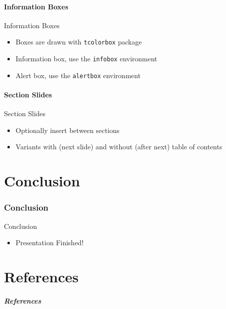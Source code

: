 \documentclass[xcolor={dvipsnames}, aspectratio=169]{beamer}
\begin{document}
\subsection{Information Boxes}
\begin{frame}{Information Boxes}
  \begin{minipage}{0.45\textwidth}
    \centering
    \begin{itemize}
    \item Boxes are drawn with \texttt{tcolorbox} package
    \item<2-> Information box, use the \texttt{infobox} environment
    \item<3-> Alert box, use the \texttt{alertbox} environment
    \end{itemize}
    \end{minipage}
  \begin{minipage}{0.45\textwidth}
    \centering
  \end{minipage}
\end{frame}

\subsection{Section Slides}
\begin{frame}{Section Slides}
  \begin{itemize}
  \item Optionally insert between sections
  \item Variants with (next slide) and without (after next) table of contents
  \end{itemize}
\end{frame}


\part[Conclusion]{Conclusion}
\section{Conclusion}
\begin{frame}{Conclusion}
  \begin{itemize}
    \item Presentation Finished!
  \end{itemize}
\end{frame}

\part[References]{References}
\begin{frame}[allowframebreaks]
  \frametitle{References}
\end{frame}
\end{document}
